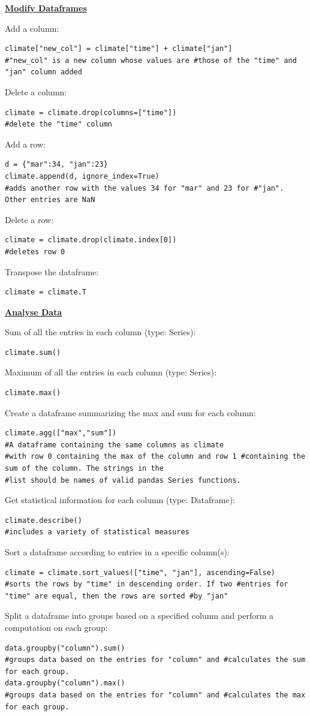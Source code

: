 {\centering\underline{\textbf{Modify Dataframes}} \par}
Add a column:
\begin{lstlisting}
climate["new_col"] = climate["time"] + climate["jan"] 
#"new_col" is a new column whose values are #those of the "time" and "jan" column added
\end{lstlisting}
Delete a column:
\begin{lstlisting}
climate = climate.drop(columns=["time"])
#delete the "time" column
\end{lstlisting}
Add a row:
\begin{lstlisting}
d = {"mar":34, "jan":23}
climate.append(d, ignore_index=True)
#adds another row with the values 34 for "mar" and 23 for #"jan". Other entries are NaN
\end{lstlisting}
Delete a row:
\begin{lstlisting}
climate = climate.drop(climate.index[0]) 
#deletes row 0
\end{lstlisting}
Transpose the dataframe:
\begin{lstlisting}
climate = climate.T
\end{lstlisting}

{\centering\underline{\textbf{Analyse Data}} \par}
Sum of all the entries in each column (type: Series):
\begin{lstlisting}
climate.sum()
\end{lstlisting}
Maximum of all the entries in each column (type: Series):
\begin{lstlisting}
climate.max()
\end{lstlisting}
Create a dataframe summarizing the max and sum for each column:
\begin{lstlisting}
climate.agg(["max","sum"])
#A dataframe containing the same columns as climate
#with row 0 containing the max of the column and row 1 #containing the sum of the column. The strings in the 
#list should be names of valid pandas Series functions. 
\end{lstlisting}
Get statistical information for each column (type: Dataframe):
\begin{lstlisting}
climate.describe()
#includes a variety of statistical measures
\end{lstlisting}
Sort a dataframe according to entries in a specific column(s):
\begin{lstlisting}
climate = climate.sort_values(["time", "jan"], ascending=False)
#sorts the rows by "time" in descending order. If two #entries for "time" are equal, then the rows are sorted #by "jan"
\end{lstlisting}
Split a dataframe into groups based on a specified column and perform a computation on each group:
\begin{lstlisting}
data.groupby("column").sum() 
#groups data based on the entries for "column" and #calculates the sum for each group.
data.groupby("column").max()
#groups data based on the entries for "column" and #calculates the max for each group.
\end{lstlisting}
